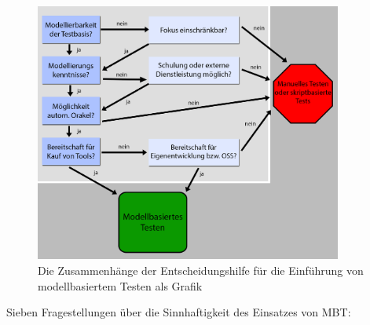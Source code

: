 \begin{figure}[h] 
  \centering
     \includegraphics[width=0.9\textwidth]{figures/entscheidungshilfe_mbt.png}
  \caption{Die Zusammenhänge der Entscheidungshilfe für die Einführung von modellbasiertem Testen als Grafik}
  \label{fig:entscheidungshilfe_mbt}
\end{figure}

Sieben Fragestellungen über die Sinnhaftigkeit des Einsatzes von \Gls{MBT}:

